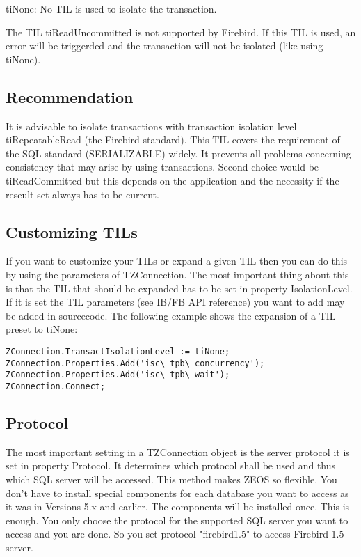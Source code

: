\documentclass[a4paper,12pt,oneside]{book}
\begin{document}
tiNone: No TIL is used to isolate the transaction.

The TIL tiReadUncommitted is not supported by Firebird.
If this TIL is used, an error will be triggerded and the transaction will not be isolated (like using tiNone).

\subsection{Recommendation}
It is advisable to isolate transactions with transaction isolation level tiRepeatableRead (the Firebird standard).
This TIL covers the requirement of the SQL standard (SERIALIZABLE) widely.
It prevents all problems concerning consistency that may arise by using transactions.
Second choice would be tiReadCommitted but this depends on the application and the necessity if the reseult set always has to be current.

\subsection{Customizing TILs}

If you want to customize your TILs or expand a given TIL then you can do this by using the parameters of TZConnection.
The most important thing about this is that the TIL that should be expanded has to be set in
property IsolationLevel.
If it is set the TIL parameters (see IB/FB API reference) you want to add may be added in sourcecode.
The following example shows the expansion of a TIL preset to tiNone:
\begin{verbatim}
ZConnection.TransactIsolationLevel := tiNone;
ZConnection.Properties.Add('isc\_tpb\_concurrency');
ZConnection.Properties.Add('isc\_tpb\_wait');
ZConnection.Connect;
\end{verbatim}

\subsection{Protocol}
The most important setting in a TZConnection object is the server protocol it is set in property Protocol.
It determines which protocol shall be used and thus which SQL server will be accessed.
This method makes ZEOS so flexible.
You don't have to install special components for each database you want to access as it was in Versions 5.x and earlier.
The components will be installed once.
This is enough.
You only choose the protocol for the supported SQL server you want to access and you are done.
So you set protocol "firebird1.5" to access Firebird 1.5 server.
\end{document}

